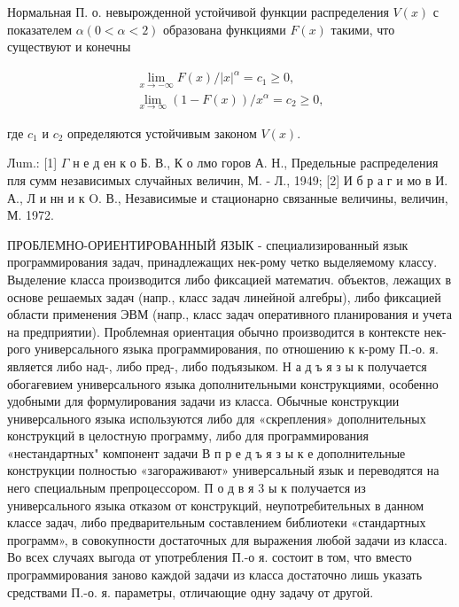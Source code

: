 \documentclass[10pt]{article}
\begin{document}
Нормальная П. о. невырожденной устойчивой функции распределения $V(x)$ с показателем $\alpha(0<\alpha<2)$ образована функциями $F(x)$ такими, что существуют и конечны



\[

\begin{gathered}

\lim _{x \rightarrow-\infty} F(x) /|x|^{\alpha}=c_{1} \geqslant 0, \\

\lim _{x \rightarrow \infty}(1-F(x)) / x^{\alpha}=c_{2} \geqslant 0,

\end{gathered}

\]



где $c_{1}$ и $c_{2}$ определяются устойчивым законом $V(x)$.



Лum.: [1] $\Gamma$ н е д ен к о Б. В., К о лмо горов А. Н., Предельные распределения пля сумм независимых случайных величин, М. - Л., 1949; [2] И б р а г и мо в И. А., Л и нн и к O. В., Независимые и стационарно связанные величины, величин, М. 1972.



ПРОБЛЕМНО-ОРИЕНТИРОВАННЫЙ ЯЗЫК - специализированный язык программирования задач, принадлежащих нек-рому четко выделяемому классу. Выделение класса производится либо фиксацией математич. объектов, лежащих в основе решаемых задач (напр., класс задач линейной алгебры), либо фиксацией области применения ЭВМ (напр., класс задач оперативного планирования и учета на предприятии). Проблемная ориентация обычно производится в контексте нек-рого универсального языка программирования, по отношению к к-рому П.-о. я. является либо над-, либо пред-, либо подъязыком. Н а д ъ я з ы к получается обогағевием универсального языка дополнительными конструкциями, особенно удобными для формулирования задачи из класса. Обычные конструкции универсального языка используются либо для «скрепления» дополнительных конструкций в целостную программу, либо для программирования «нестандартных" компонент задачи В п р е д ъ я з ы к е дополнительные конструкции полностью «загораживают» универсальный язык и переводятся на него специальным препроцессором. П о д в я 3 ы к получается из универсального языка отказом от конструкций, неупотребительных в данном классе задач, либо предварительным составлением библиотеки «стандартных программ», в совокупности достаточных для выражения любой задачи из класса. Во всех случаях выгода от употребления П.-о я. состоит в том, что вместо программирования заново каждой задачи из класса достаточно лишь указать средствами П.-о. я. параметры, отличающие одну задачу от другой.
\end{document}
